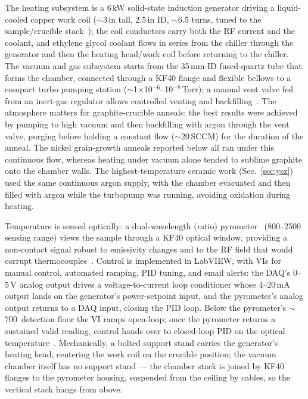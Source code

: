 \documentclass[%
 aip,
 rsi,%
 amsmath,amssymb,
 reprint,%
]{revtex4-2}
\begin{document}
The heating subsystem is a 6\,kW solid-state induction generator driving a
liquid-cooled copper work coil
($\sim$3\,in tall, 2.5\,in ID, $\sim$6.5 turns, tuned to the sample/crucible
stack~\cite{vankan2024electromagneticinductionheating,xu2026designandoptimization});
the coil conductors carry both the RF current and the coolant, and ethylene
glycol coolant flows in series from the chiller through the generator and then
the heating head/work coil before returning to the chiller.
The vacuum and gas subsystem starts from the 35\,mm-ID fused-quartz tube that
forms the chamber, connected through a KF40 flange and flexible bellows to a
compact turbo pumping station
($\sim$1$\times$10$^{-6}$--10$^{-8}$\,Torr); a manual vent valve fed from an
inert-gas regulator allows controlled venting and
backfilling~\cite{kanda2007developmentofhightemperature,inaba1986effectsofthe}.
The atmosphere matters for graphite-crucible anneals: the best results were
achieved by pumping to high vacuum and then backfilling with argon through the
vent valve, purging before holding a constant flow ($\sim$20\,SCCM) for the
duration of the anneal. The nickel grain-growth anneals reported below all ran
under this continuous flow, whereas heating under vacuum alone tended to
sublime graphite onto the chamber walls. The highest-temperature ceramic work
(Sec.~\ref{sec:ysz}) used the same continuous argon supply, with the chamber
evacuated and then filled with argon while the turbopump was running, avoiding
oxidation during heating.

Temperature is sensed optically: a dual-wavelength (ratio)
pyrometer~\cite{tapetado2016twocolorpyrometerfor,belikov2024fastmultiwavelengthpyrometer}
(800--2500\,\celsius{} sensing range) views the sample through a KF40
optical window, providing a non-contact signal robust to emissivity changes
and to the RF field that would corrupt
thermocouples~\cite{ham2016insituspectralemissivity,suleiman2025improvingpyrometryof,usamentiaga2014infraredthermographyfor}.
Control is implemented in LabVIEW, with VIs for manual control, automated
ramping, PID tuning, and email alerts: the DAQ's 0--5\,V analog output drives
a voltage-to-current loop conditioner whose 4--20\,mA output lands on the
generator's power-setpoint input, and the pyrometer's analog output returns to a DAQ input, closing
the PID loop. Below the pyrometer's $\sim$700\,\celsius{} detection floor the
VI ramps open-loop; once the pyrometer returns a sustained valid reading,
control hands over to closed-loop PID on the optical
temperature~\cite{meng2023designofvacuum,rapoport2006optimalcontrolof}.
Mechanically, a bolted support stand carries the generator's heating head,
centering the work coil on the crucible position; the vacuum chamber itself
has no support stand --- the chamber stack is joined by KF40 flanges to the
pyrometer housing, suspended from the ceiling by cables, so the vertical stack
hangs from above.
\end{document}
